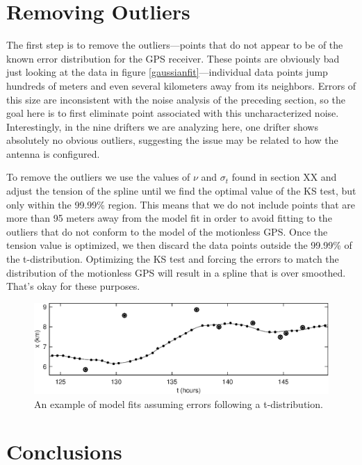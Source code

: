 \documentclass[twocol]{ametsoc}
\begin{document}
\section{Removing Outliers}

The first step is to remove the outliers---points that do not appear to be of the known error distribution for the GPS receiver. These points are obviously bad just looking at the data in figure \ref{gaussianfit}---individual data points jump hundreds of meters and even several kilometers away from its neighbors. Errors of this size are inconsistent with the noise analysis of the preceding section, so the goal here is to first eliminate point associated with this uncharacterized noise. Interestingly, in the nine drifters we are analyzing here, one drifter shows absolutely no obvious outliers, suggesting the issue may be related to how the antenna is configured.

To remove the outliers we use the values of $\nu$ and $\sigma_t$ found in section XX and adjust the tension of the spline until we find the optimal value of the KS test, but only within the 99.99\% region. This means that we do not include points that are more than 95 meters away from the model fit in order to avoid fitting to the outliers that do not conform to the model of the motionless GPS. Once the tension value is optimized, we then discard the data points outside the 99.99\% of the t-distribution. Optimizing the KS test and forcing the errors to match the distribution of the motionless GPS will result in a spline that is over smoothed. That's okay for these purposes.

\begin{figure}[t]
  \centerline{\includegraphics[width=39pc,angle=0]{tdistributionfit}}
  
  \caption{An example of model fits assuming errors following a t-distribution.}
  \label{tdistributionfit}
\end{figure}



\section{Conclusions}
\end{document}
